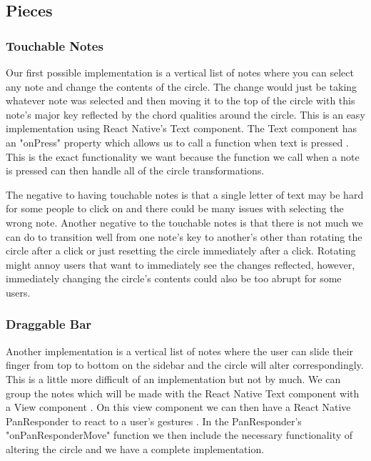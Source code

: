 \documentclass[onecolumn, draftclsnofoot,10pt, compsoc]{IEEEtran}
\begin{document}
\subsection{Pieces}
\subsubsection{Touchable Notes}

Our first possible implementation is a vertical list of notes where you can select any note and change the contents of the circle.
The change would just be taking whatever note was selected and then moving it to the top of the circle with this note's major key reflected by the chord qualities around the circle.
This is an easy implementation using React Native's Text component.
The Text component has an "onPress" property which allows us to call a function when text is pressed \cite{rntext}.
This is the exact functionality we want because the function we call when a note is pressed can then handle all of the circle transformations.

The negative to having touchable notes is that a single letter of text may be hard for some people to click on and there could be many issues with selecting the wrong note.
Another negative to the touchable notes is that there is not much we can do to transition well from one note's key to another's other than rotating the circle after a click or just resetting the circle immediately after a click.
Rotating might annoy users that want to immediately see the changes reflected, however, immediately changing the circle's contents could also be too abrupt for some users.

\subsubsection{Draggable Bar}

Another implementation is a vertical list of notes where the user can slide their finger from top to bottom on the sidebar and the circle will alter correspondingly.
This is a little more difficult of an implementation but not by much.
We can group the notes which will be made with the React Native Text component with a View component \cite{rnview}.
On this view component we can then have a React Native PanResponder to react to a user's gestures \cite{rnpan}.
In the PanResponder's "onPanResponderMove" function we then include the necessary functionality of altering the circle and we have a complete implementation.
\end{document}
